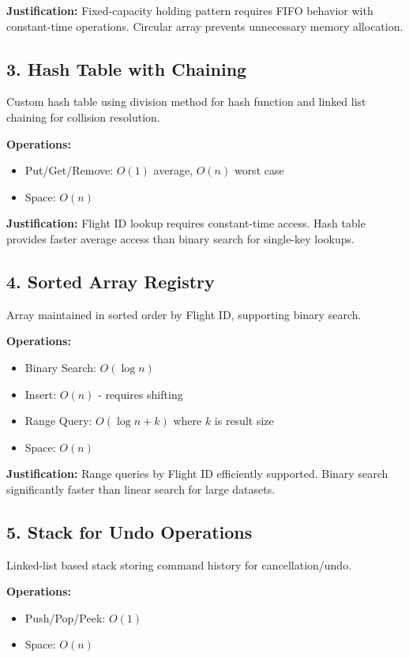 \documentclass[12pt,a4paper]{article}
\begin{document}
\textbf{Justification:} Fixed-capacity holding pattern requires FIFO behavior with constant-time operations. Circular array prevents unnecessary memory allocation.

\subsection{3. Hash Table with Chaining}

Custom hash table using division method for hash function and linked list chaining for collision resolution.

\textbf{Operations:}
\begin{itemize}
    \item Put/Get/Remove: $O(1)$ average, $O(n)$ worst case
    \item Space: $O(n)$
\end{itemize}

\textbf{Justification:} Flight ID lookup requires constant-time access. Hash table provides faster average access than binary search for single-key lookups.

\subsection{4. Sorted Array Registry}

Array maintained in sorted order by Flight ID, supporting binary search.

\textbf{Operations:}
\begin{itemize}
    \item Binary Search: $O(\log n)$
    \item Insert: $O(n)$ - requires shifting
    \item Range Query: $O(\log n + k)$ where $k$ is result size
    \item Space: $O(n)$
\end{itemize}

\textbf{Justification:} Range queries by Flight ID efficiently supported. Binary search significantly faster than linear search for large datasets.

\subsection{5. Stack for Undo Operations}

Linked-list based stack storing command history for cancellation/undo.

\textbf{Operations:}
\begin{itemize}
    \item Push/Pop/Peek: $O(1)$
    \item Space: $O(n)$
\end{itemize}
\end{document}
